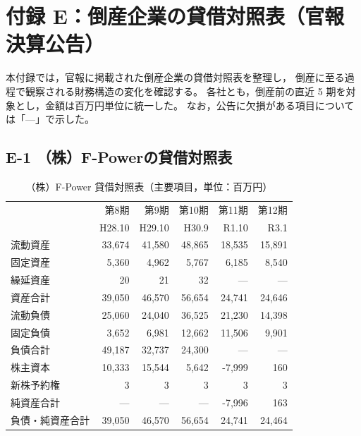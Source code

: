 
%

\chapter*{付録 E：倒産企業の貸借対照表（官報決算公告）}

本付録では，官報に掲載された倒産企業の貸借対照表を整理し，
倒産に至る過程で観察される財務構造の変化を確認する。
各社とも，倒産前の直近 5 期を対象とし，金額は百万円単位に統一した。
なお，公告に欠損がある項目については「—」で示した。

\section*{E-1 （株）F-Powerの貸借対照表}


\begin{table}[H]
\centering
\caption{（株）F-Power 貸借対照表（主要項目，単位：百万円）}
\begin{tabular}{lrrrrr}
\toprule
 & 第8期 & 第9期 & 第10期 & 第11期 & 第12期 \\
 & H28.10 & H29.10 & H30.9 & R1.10 & R3.1 \\
\midrule
流動資産       & 33{,}674 & 41{,}580 & 48{,}865 & 18{,}535 & 15{,}891 \\
固定資産       & 5{,}360  & 4{,}962  & 5{,}767  & 6{,}185  & 8{,}540 \\
繰延資産       & 20       & 21       & 32       & —       & — \\
\midrule
資産合計       & 39{,}050 & 46{,}570 & 56{,}654 & 24{,}741 & 24{,}646 \\
\midrule
流動負債       & 25{,}060 & 24{,}040 & 36{,}525 & 21{,}230 & 14{,}398 \\
固定負債       & 3{,}652  & 6{,}981  & 12{,}662 & 11{,}506 & 9{,}901 \\
負債合計       & 49{,}187 & 32{,}737 & 24{,}300 & —       & — \\
\midrule
株主資本       & 10{,}333 & 15{,}544 & 5{,}642  & -7{,}999 & 160 \\
新株予約権     & 3        & 3        & 3        & 3        & 3 \\
純資産合計     & —        & —        & —        & -7{,}996 & 163 \\
\midrule
負債・純資産合計 & 39{,}050 & 46{,}570 & 56{,}654 & 24{,}741 & 24{,}464 \\
\bottomrule
\end{tabular}
\end{table}

